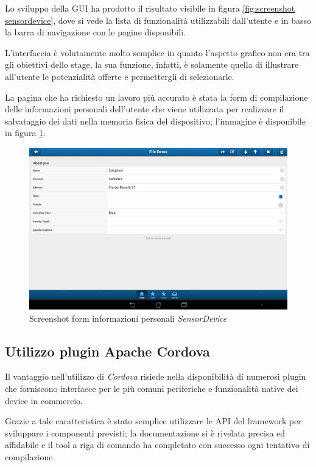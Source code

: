 Lo sviluppo della \ac{GUI} ha prodotto il risultato visibile in figura \ref{fig:screenshot sensordevice}, dove si vede la lista di funzionalità utilizzabili dall'utente e in basso la barra di navigazione con le pagine disponibili.

L'interfaccia è volutamente molto semplice in quanto l'aspetto grafico non era tra gli obiettivi dello stage, la sua funzione, infatti, è solamente quella di illustrare all'utente le potenzialità offerte e permettergli di selezionarle.

La pagina che ha richiesto un lavoro più accurato è stata la form di compilazione delle informazioni personali dell'utente che viene utilizzata per realizzare il salvataggio dei dati nella memoria fisica del dispositivo; l'immagine è disponibile in figura \ref{fig:screenshot file sensordevice}.

\begin{figure}[htb]
\centering
\includegraphics[scale=0.25]{gfx/screenshot/screen_file_sensorDevice}
\caption{Screenshot form informazioni personali \emph{SensorDevice}}
\label{fig:screenshot file sensordevice}
\end{figure}

\subsection{Utilizzo plugin Apache Cordova}
Il vantaggio nell'utilizzo di \emph{Cordova} risiede nella disponibilità di numerosi plugin che forniscono interfacce per le più comuni periferiche e funzionalità native dei device in commercio.

Grazie a tale caratteristica è stato semplice utilizzare le \ac{API} del framework per sviluppare i componenti previsti; la documentazione si è rivelata precisa ed affidabile e il tool a riga di comando ha completato con successo ogni tentativo di compilazione.

